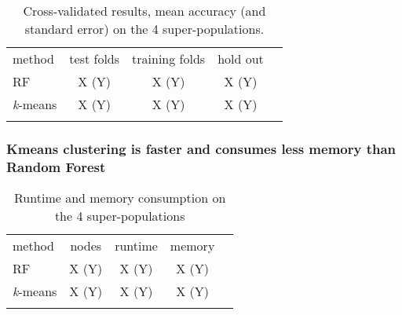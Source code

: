 \documentclass{llncs}
\newcommand{\kMeans}{\textit{k}-means}
\begin{document}
{%

\begin{table}
\caption{Cross-validated results, mean accuracy (and standard error) on the 4 super-populations.}
\begin{center}
\renewcommand{\arraystretch}{1.4}
\setlength\tabcolsep{3pt}
\begin{tabular}{lcccc}
\hline\noalign{\smallskip}
method  & test folds & training folds & hold out \\
RF  & X (Y) & X (Y) & X (Y) \\
\kMeans & X (Y) & X (Y) & X (Y) \\
\noalign{\smallskip}
\hline
\end{tabular}
\end{center}
\end{table}







\subsubsection{Kmeans clustering is faster and consumes less memory than Random Forest}



\begin{table}
\caption{Runtime and memory consumption on the 4 super-populations}
\begin{center}
\renewcommand{\arraystretch}{1.4}
\setlength\tabcolsep{3pt}
\begin{tabular}{lcccc}
\hline\noalign{\smallskip}
method  & nodes & runtime & memory \\
RF  & X (Y) & X (Y) & X (Y) \\
\kMeans & X (Y) & X (Y) & X (Y) \\
\noalign{\smallskip}
\hline
\end{tabular}
\end{center}
\end{table}




}
\end{document}
